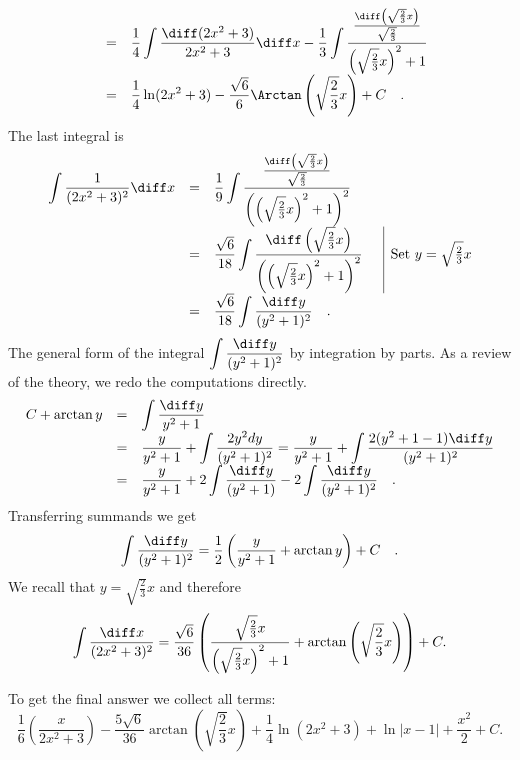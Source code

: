 {\[\begin{array}{rcl}
&=&\displaystyle  \frac{1}{4} \int \frac{\diff(2x^2+3)}{2x^2+3}\diff x- \frac{1}{3}\int \frac{\frac{\diff \left(\sqrt{\frac23}x\right)} {\sqrt{\frac23}}} {\left( \sqrt{\frac23}x\right)^2+1} \\
&=&\displaystyle   \frac{1}{4}\ln (2x^2+3)-\frac{\sqrt{6}}{6}\Arctan \left(\sqrt{\frac23}x\right)+C
\quad .
\end{array}
\]
The last integral is
\[
\begin{array}{rcll|l}
\displaystyle \int \frac{1}{(2x^2+3)^2}\diff x&=&\displaystyle  \frac{1}{9} \int \frac{\frac{\diff\left(\sqrt{\frac{2}{3}}x\right)}{\sqrt{\frac23}}}{\left(\left(\sqrt{\frac23}x\right)^2+1\right)^2}\\
&=&\displaystyle  \frac{\sqrt{6}}{18}\int \frac{\diff\left(\sqrt{\frac23}x\right)}{\left(\left(\sqrt{\frac23}x\right)^2+1\right)^2} &&\text{Set }y=\sqrt{\frac23}x\\
&=&\displaystyle  \frac{\sqrt{6}}{18}\int \frac{\diff y}{(y^2+1)^2}\quad.
\end{array}
\]
The general form of the integral $\displaystyle\int \frac{\diff y}{(y^2+1)^2}$  by integration by parts. As a review of the theory, we redo the computations directly.
\[
\begin{array}{rcl}
C+\arctan y &=&\displaystyle \int \frac{\diff y}{y^2+1}\\
&=&\displaystyle \frac{y}{y^2+1} +\int \frac{2y^2dy }{( y^2+ 1 )^2}= \frac{y}{y^2+1}+\int \frac{2(y^2+1-1)\diff y}{(y^2+1)^2}\\
&=&\displaystyle \frac{y}{y^2+1} + 2\int \frac{\diff y}{ ( y^2 +1)}- 2\int \frac{\diff y}{(y^2+1)^2}\quad.
\end{array}
\]
Transferring summands we get
\[
\int \frac{\diff y}{(y^2+1)^2}= \frac{1}{2} \left( \frac{ y }{y^2+1} +\arctan y\right) +C\quad .
\]
We recall that $y=\sqrt{\frac{2}{3}}x$ and therefore
\[
\int \frac{\diff x}{(2x^2+3)^2}=\frac{\sqrt{6}}{36}\left(\frac{\sqrt{\frac{2}{3}}x}{\left(\sqrt{\frac{2}{3}}x\right)^2+1}+\arctan \left( \sqrt{\frac{2}{3}}x\right)\right) +C.
\]

To get the final answer we collect all terms:
\[
\frac{1}{6}\left(\frac{x}{2x^2+3}\right) - \frac{5\sqrt{6}}{36} \arctan \left(\sqrt{\frac{2}{3}}x \right) +\frac{1}{4} \ln (2x^2+3) +\ln|x-1|+\frac{x ^2 } 2+ C .
\]
}